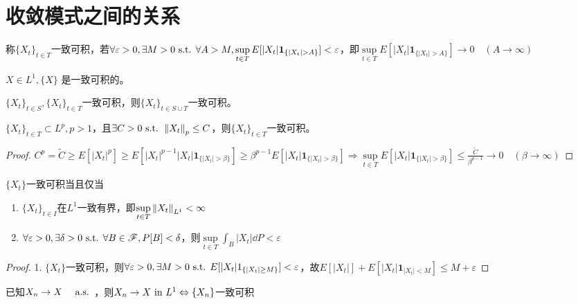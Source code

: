\documentclass{ctexart}
\begin{document}
\section{收敛模式之间的关系}
\begin{Def}
  称$\{X_{t}\}_{t\in T}$一致可积，若$\forall\varepsilon>0,\exists M>0\st \forall A>M, \sup\limits_{t\in T}E[|X_{t}|\bm{1}_{\{|X_{t}|>A\}}]<\varepsilon$，即$\sup\limits_{t\in T}E[|X_{t}|\bm{1}_{\{|X_{t}|>A\}}]\to 0\quad(A\to\infty)$
\end{Def}

\begin{Eg}
  $X\in L^{1},\{X\}$ 是一致可积的。
\end{Eg}

\begin{Eg}
  $\{X_{t}\}_{t\in S},\{X_{t}\}_{t\in T}$一致可积，则$\{X_{t}\}_{t\in S\cup T}$一致可积。
\end{Eg}

\begin{Eg}
  $\{X_{t}\}_{t\in T}\subset L^{p},p>1$，且$\exists C>0\text{ s.t. }\left\|X_{t}\right\|_{p}\leq C$，则$\{X_{t}\}_{t\in T}$一致可积。
\end{Eg}

\begin{proof}
  $C^{p}=\tilde C\geq E[|X_{t}|^{p}]\geq E[|X_{t}|^{p-1}|X_{t}|\bm{1}_{\{|X_{t}|>\beta\}}]\geq \beta^{p-1}E[|X_{t}|\bm{1}_{\{|X_{t}|>\beta\}}]\Rightarrow \sup\limits_{t\in T}E[|X_{t}|\bm{1}_{\{|X_{t}|>\beta\}}]\leq\frac{\tilde C}{\beta^{p-1}}\to 0\quad (\beta\to\infty)$
\end{proof}

\begin{Thm}
  $\{X_{t}\}$一致可积当且仅当
  \begin{enumerate}
  \item $\{X_{t}\}_{t\in I}$在$L^{1}$一致有界，即$\sup\limits_{t\in T}\left\|X_{t}\right\|_{L^{1}}<\infty$
  \item $\forall\varepsilon>0, \exists \delta>0\text{ s.t. }\forall B\in \mathscr{F}, P[B]<\delta$，则$\sup\limits_{t\in T}\int_{B}|X_{t}|\dd P<\varepsilon$
  \end{enumerate}
\end{Thm}

\begin{proof}
  1. $\{X_{t}\}$一致可积，则$\forall\varepsilon>0,\exists M>0\text{ s.t. } E[|X_{t}|1_{\{|X_{t}|\geq M\}}]<\varepsilon$，故$E[|X_{t}|]+E[|X_{t}|\bm{1}_{|X_{t}|<M}]\leq M+\varepsilon$
\end{proof}
\begin{Thm}
  已知$X_{n}\to X\quad \text{ a.s. }$，则$X_{n}\to X\text{ in } L^{1}\Leftrightarrow \{X_{n}\}$一致可积
\end{Thm}
\end{document}

